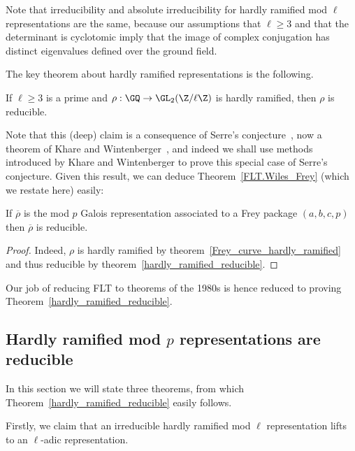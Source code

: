 Note that irreducibility and absolute irreducibility for hardly ramified mod $\ell$ representations
are the same, because our assumptions that $\ell\geq3$
and that the determinant is cyclotomic imply that the image of complex conjugation
has distinct eigenvalues defined over the ground field.

The key theorem about hardly ramified representations is the following.

\begin{theorem}
  \label{hardly_ramified_reducible}
  \leanok
  If $\ell\geq 3$ is a prime and $\rho:\GQ\to\GL_2(\Z/\ell\Z)$ is hardly ramified,
  then $\rho$ is reducible.
\end{theorem}

Note that this (deep) claim is a consequence of Serre's conjecture~\cite{serreconj},
now a theorem of Khare and Wintenberger~\cite{kwII}, and indeed we shall use
methods introduced by Khare and Wintenberger to prove this special case of
Serre's conjecture. Given this result, we can deduce Theorem~\ref{FLT.Wiles_Frey}
(which we restate here) easily:

\begin{theorem}
  \label{FLT.Wiles_Frey_again}
  \leanok
  If $\overline{\rho}$ is the mod $p$ Galois representation associated to a Frey package $(a,b,c,p)$ then
  $\overline{\rho}$ is reducible.
\end{theorem}
\begin{proof}
  Indeed, $\rho$ is hardly ramified by theorem~\ref{Frey_curve_hardly_ramified}
  and thus reducible by theorem~\ref{hardly_ramified_reducible}.
\end{proof}

Our job of reducing FLT to theorems of the 1980s is hence reduced to proving
Theorem~\ref{hardly_ramified_reducible}.

\subsection{Hardly ramified mod $p$ representations are reducible}

In this section we will state three theorems, from which Theorem~\ref{hardly_ramified_reducible}
easily follows.

Firstly, we claim that
an irreducible hardly ramified mod $\ell$ representation lifts to an $\ell$-adic representation.

